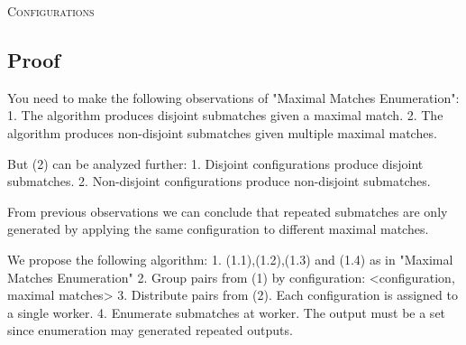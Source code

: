 \documentclass[12pt, a4paper]{article}
\begin{document}
\begin{algorithm}[H]
  \DontPrintSemicolon
  \SetAlgoNoLine

\caption{\textsc{Configurations}}
\label{algo:configurations}
\end{algorithm}

\subsection{Proof}
\label{subsec:proof}

You need to make the following observations of "Maximal Matches Enumeration":
1. The algorithm produces disjoint submatches given a maximal match.
2. The algorithm produces non-disjoint submatches given multiple maximal matches.

But (2) can be analyzed further:
1. Disjoint configurations produce disjoint submatches.
2. Non-disjoint configurations produce non-disjoint submatches.

From previous observations we can conclude that repeated submatches are only generated by applying the same configuration to different maximal matches.

We propose the following algorithm:
1. (1.1),(1.2),(1.3) and (1.4) as in "Maximal Matches Enumeration"
2. Group pairs from (1) by configuration: <configuration, {maximal matches}>
3. Distribute pairs from (2). Each configuration is assigned to a single worker.
4. Enumerate submatches at worker. The output must be a set since enumeration may generated repeated outputs.
\end{document}
